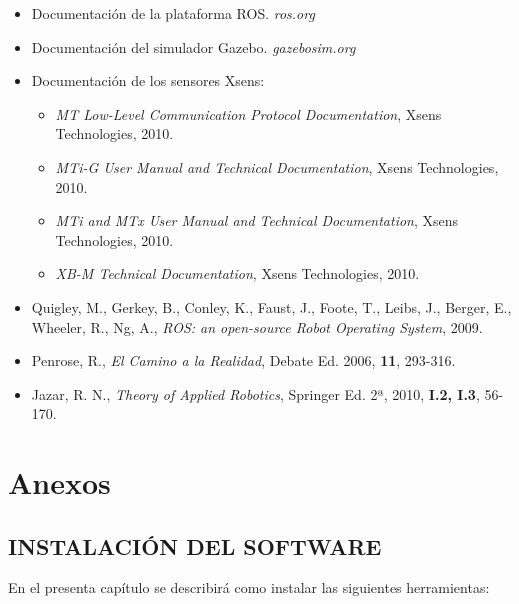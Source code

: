 \documentclass[12pt, a4paper]{report}
\begin{document}
\begin{itemize}
\item Documentación de la plataforma ROS. \textit{ros.org}\\

\item Documentación del simulador Gazebo. \textit{gazebosim.org}\\

\item Documentación de los sensores Xsens:

	\begin{itemize}
	\item \textit{MT Low-Level Communication Protocol Documentation}, Xsens Technologies, 2010.
	\item \textit{MTi-G User Manual and Technical Documentation}, Xsens 	Technologies, 2010.
	\item \textit{MTi and MTx User Manual and Technical Documentation}, Xsens Technologies, 2010.
	\item \textit{XB-M Technical Documentation}, Xsens Technologies, 2010.
	\end{itemize}

\item Quigley, M., Gerkey, B., Conley, K., Faust, J., Foote, T., Leibs, J., Berger, E., Wheeler, R., Ng, A., \textit{ROS: an open-source Robot Operating System}, 2009.

\item Penrose, R., \textit{El Camino a la Realidad}, Debate Ed. 2006, \textbf{11}, 293-316.\\

\item Jazar, R. N., \textit{Theory of Applied Robotics}, Springer Ed. 2ª, 2010, \textbf{I.2, I.3}, 56-170.\\
\end{itemize}


\part{Anexos}

\appendix

\chapter{INSTALACIÓN DEL SOFTWARE}

En el presenta capítulo se describirá como instalar las siguientes herramientas:
\end{document}
